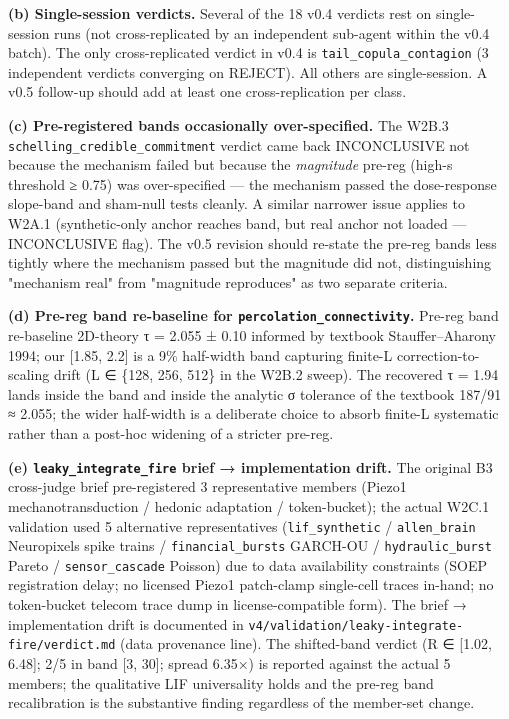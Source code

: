 \documentclass[
  11pt]{article}
\begin{document}
\textbf{(b) Single-session verdicts.} Several of the 18 v0.4 verdicts
rest on single-session runs (not cross-replicated by an independent
sub-agent within the v0.4 batch). The only cross-replicated verdict in
v0.4 is \texttt{tail\_copula\_contagion} (3 independent verdicts
converging on REJECT). All others are single-session. A v0.5 follow-up
should add at least one cross-replication per class.

\textbf{(c) Pre-registered bands occasionally over-specified.} The W2B.3
\texttt{schelling\_credible\_commitment} verdict came back INCONCLUSIVE
not because the mechanism failed but because the \emph{magnitude}
pre-reg (high-s threshold ≥ 0.75) was over-specified --- the mechanism
passed the dose-response slope-band and sham-null tests cleanly. A
similar narrower issue applies to W2A.1 (synthetic-only anchor reaches
band, but real anchor not loaded --- INCONCLUSIVE flag). The v0.5
revision should re-state the pre-reg bands less tightly where the
mechanism passed but the magnitude did not, distinguishing "mechanism
real" from "magnitude reproduces" as two separate criteria.

\textbf{(d) Pre-reg band re-baseline for
\texttt{percolation\_connectivity}.} Pre-reg band re-baseline
2D-theory τ = 2.055 ± 0.10 informed by textbook Stauffer--Aharony 1994;
our {[}1.85, 2.2{]} is a 9\% half-width band capturing finite-L
correction-to-scaling drift (L ∈ \{128, 256, 512\} in the W2B.2 sweep).
The recovered τ = 1.94 lands inside the band and inside the analytic σ
tolerance of the textbook 187/91 ≈ 2.055; the wider half-width is a
deliberate choice to absorb finite-L systematic rather than a post-hoc
widening of a stricter pre-reg.

\textbf{(e) \texttt{leaky\_integrate\_fire} brief → implementation
drift.} The original B3 cross-judge brief pre-registered 3
representative members (Piezo1 mechanotransduction / hedonic adaptation
/ token-bucket); the actual W2C.1 validation used 5 alternative
representatives (\texttt{lif\_synthetic} / \texttt{allen\_brain}
Neuropixels spike trains / \texttt{financial\_bursts} GARCH-OU /
\texttt{hydraulic\_burst} Pareto / \texttt{sensor\_cascade} Poisson) due
to data availability constraints (SOEP registration delay; no licensed
Piezo1 patch-clamp single-cell traces in-hand; no token-bucket telecom
trace dump in license-compatible form). The brief → implementation
drift is documented in
\texttt{v4/validation/leaky-integrate-fire/verdict.md} (data provenance
line). The shifted-band verdict (R ∈ {[}1.02, 6.48{]}; 2/5 in band
{[}3, 30{]}; spread 6.35×) is reported against the actual 5 members; the
qualitative LIF universality holds and the pre-reg band recalibration is
the substantive finding regardless of the member-set change.
\end{document}
